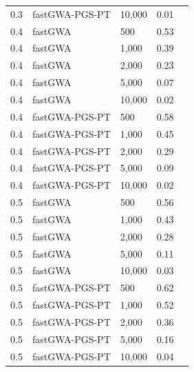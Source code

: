 \documentclass[10pt]{article}
\begin{document}
\begin{table}[!htb]
\begin{tabular}{rllrr}
  0.3 & fastGWA-PGS-PT & 10,000 & 0.01 \\ 
  0.4 & fastGWA & 500 & 0.53 \\ 
  0.4 & fastGWA & 1,000 & 0.39 \\ 
  0.4 & fastGWA & 2,000 & 0.23 \\ 
  0.4 & fastGWA & 5,000 & 0.07 \\ 
  0.4 & fastGWA & 10,000 & 0.02 \\ 
  0.4 & fastGWA-PGS-PT & 500 & 0.58 \\ 
  0.4 & fastGWA-PGS-PT & 1,000 & 0.45 \\ 
  0.4 & fastGWA-PGS-PT & 2,000 & 0.29 \\ 
  0.4 & fastGWA-PGS-PT & 5,000 & 0.09 \\ 
  0.4 & fastGWA-PGS-PT & 10,000 & 0.02 \\ 
  0.5 & fastGWA & 500 & 0.56 \\ 
  0.5 & fastGWA & 1,000 & 0.43 \\ 
  0.5 & fastGWA & 2,000 & 0.28 \\ 
  0.5 & fastGWA & 5,000 & 0.11 \\ 
  0.5 & fastGWA & 10,000 & 0.03 \\ 
  0.5 & fastGWA-PGS-PT & 500 & 0.62 \\ 
  0.5 & fastGWA-PGS-PT & 1,000 & 0.52 \\ 
  0.5 & fastGWA-PGS-PT & 2,000 & 0.36 \\ 
  0.5 & fastGWA-PGS-PT & 5,000 & 0.16 \\ 
  0.5 & fastGWA-PGS-PT & 10,000 & 0.04 \\ 
   \hline
\end{tabular}
\end{table}
\end{document}
